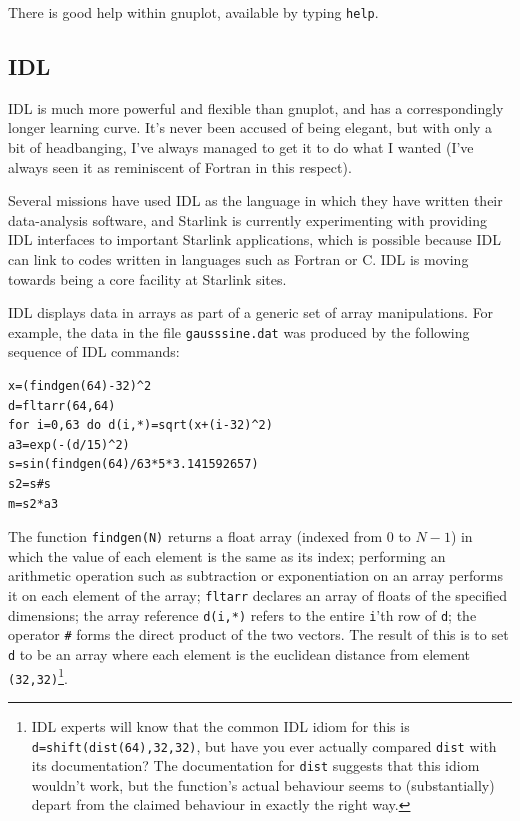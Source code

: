 \documentclass[11pt,oneside,chapters]{starlink}
\begin{document}
There is good help within gnuplot, available by typing
\texttt{help}.

\subsection{IDL}
\label{s:vis-idl}

IDL is much more powerful and flexible than gnuplot, and
has a correspondingly longer learning curve.  It's never
been accused of being elegant, but with only a bit of
headbanging, I've always managed to get it to do what I
wanted (I've always seen it as reminiscent of Fortran in
this respect).

Several missions have used IDL as the language in which
they have written their data-analysis software, and
Starlink is currently experimenting with providing IDL
interfaces to important Starlink applications, which is
possible because IDL can link to codes written in
languages such as Fortran or C.  IDL is moving towards
being a core facility at Starlink sites.

IDL displays data in arrays as part of a generic set of array
manipulations.  For example, the data in the file
\texttt{gausssine.dat} was produced by the following
sequence of IDL commands:

\begin{verbatim}
x=(findgen(64)-32)^2
d=fltarr(64,64)
for i=0,63 do d(i,*)=sqrt(x+(i-32)^2)
a3=exp(-(d/15)^2)
s=sin(findgen(64)/63*5*3.141592657)
s2=s#s
m=s2*a3
\end{verbatim}

The function \texttt{findgen(N)} returns a float array
(indexed from 0 to $N-1$) in
which the value of each element is the same as its index;
performing an arithmetic operation such as subtraction or
exponentiation on an array performs it on each element of
the array; \texttt{fltarr} declares an array of floats
of the specified dimensions; the array reference
\texttt{d(i,*)} refers to the entire \texttt{i}'th
row of \texttt{d}; the operator \texttt{\#} forms
the direct product of the two vectors.  The result of this
is to set \texttt{d} to be an array where each element
is the euclidean distance from element
\texttt{(32,32)}\footnote{IDL experts will know that
the common IDL idiom for this is
\texttt{d=shift(dist(64),32,32)}, but have you ever
actually compared \texttt{dist} with its
documentation?  The documentation for \texttt{dist}
suggests that this idiom wouldn't work, but the function's
actual behaviour seems to (substantially) depart from the
claimed behaviour in exactly the right way.}.
\end{document}
